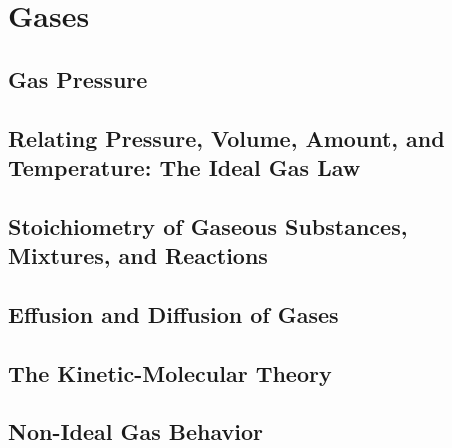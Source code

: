 \documentclass[12pt, openany, letterpaper]{memoir}
\begin{document}
\chapter{Gases}

\section{Gas Pressure}

\section{Relating Pressure, Volume, Amount, and Temperature: The Ideal Gas Law}

\section{Stoichiometry of Gaseous Substances, Mixtures, and Reactions}

\section{Effusion and Diffusion of Gases}

\section{The Kinetic-Molecular Theory}

\section{Non-Ideal Gas Behavior}
\end{document}
